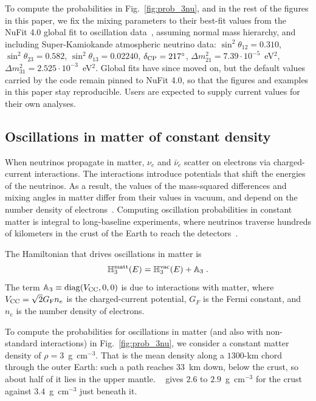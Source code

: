 \documentclass[final,5p,times,twocolumn,sort,compress]{elsarticle}
\newcommand{\fig}{Fig.}
\providecommand{\Ref}{}
\newcommand{\figu}[1]{\fig~\ref{fig:#1}}
\begin{document}
To compute the probabilities in \figu{prob_3nu}, and in the rest of the figures in this paper, we fix the mixing parameters to their best-fit values from the NuFit 4.0 global fit to oscillation data\ \cite{Esteban:2018azc, NuFit4.0}, assuming normal mass hierarchy, and including Super-Kamiokande atmospheric neutrino data: $\sin^2 \theta_{12} = 0.310$, $\sin^2 \theta_{23} = 0.582$, $\sin^2 \theta_{13} = 0.02240$, $\delta_{\rm CP} = 217^\circ$, $\Delta m_{21}^2 = 7.39 \cdot 10^{-5}$~eV$^2$, $\Delta m_{31}^2 = 2.525 \cdot 10^{-3}$~eV$^2$.  Global fits have since moved on, but the default values carried by the code remain pinned to NuFit 4.0, so that the figures and examples in this paper stay reproducible.  Users are expected to supply current values for their own analyses.


\subsection{Oscillations in matter of constant density}
\label{sec:prob_3nu_matter}

When neutrinos propagate in matter, $\nu_e$ and $\bar{\nu}_e$ scatter on electrons via charged-current interactions.  The interactions introduce potentials that shift the energies of the neutrinos.  As a result, the values of the mass-squared differences and mixing angles in matter differ from their values in vacuum, and depend on the number density of electrons\ \cite{Wolfenstein:1977ue, Mikheev:1986gs, Bethe:1986ej, Parke:1986jy, Rosen:1986jy}.  Computing oscillation probabilities in constant matter is integral to long-baseline experiments, where neutrinos traverse hundreds of kilometers in the crust of the Earth to reach the detectors\ \cite{Feldman:2013vca, Diwan:2016gmz}.

The Hamiltonian that drives oscillations in matter is
\begin{equation}
 \mathbb{H}_3^{\rm matt}(E)
 = 
 \mathbb{H}_3^{\rm vac}(E) + \mathbb{A}_3 \;.
\end{equation}
The term $\mathbb{A}_3 \equiv {\rm diag}(V_{\rm CC}, 0 ,0)$ is due to interactions with matter, where $V_{\rm CC} = \sqrt{2} G_{\rm F} n_e$ is the charged-current potential, $G_F$ is the Fermi constant, and $n_e$ is the number density of electrons.

To compute the probabilities for oscillations in matter (and also with non-standard interactions) in \figu{prob_3nu}, we consider a constant matter density of $\rho = 3$~g~cm$^{-3}$.  That is the mean density along a $1300$-km chord through the outer Earth: such a path reaches $33$~km down, below the crust, so about half of it lies in the upper mantle.  \Ref\ \cite{Dziewonski:1981xy} gives $2.6$ to $2.9$~g~cm$^{-3}$ for the crust against $3.4$~g~cm$^{-3}$ just beneath it.
\end{document}
